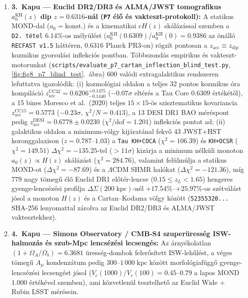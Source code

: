 \documentclass[11pt,a4paper]{article}
\theoremstyle{remark}
\begin{document}
\begin{enumerate}
  \item \textbf{3.\ Kapu --- Euclid DR2/DR3 \'es ALMA/JWST tomografikus $a_0^{\mathrm{KH}}(z)$ dip $z = 0.6316$-n\'al (\texttt{P7} \'el\H{o} \'es vakteszt-protokoll):} A statikus MOND-dal ($a_0 = \mathrm{konst.}$) \'es a kinematikai $cH(z)$ sk\'al\'az\'assal szemben a \texttt{D2.\ t\'etel} $6.14\%$-os m\'ely\"ul\'est ($a_0^{\mathrm{KH}}(0.6309)/a_0^{\mathrm{KH}}(0) = 0.9386$ az \"on\'all\'o \texttt{RECFAST v1.5} h\'att\'eren, $0.6316$ Planck PR3-on) r\"ogz\'it pontosan a $z_{\mathrm{acc}} \equiv z_{\mathrm{dip}}$ kozmikus gyorsul\'asi inflekci\'os pontban. T\"obbszond\'as empirikus \'es vakteszt-motorunkat (\texttt{scripts/\allowbreak evaluate\_\allowbreak p7\_\allowbreak cartan\_\allowbreak inflection\_\allowbreak blind\_\allowbreak test.py}, \ref{fig:fig8_p7_blind_test}.\ \'abra) $600$ val\'odi extragalaktikus rendszeren lefuttatva igazol\'odik: (i) kozmol\'ogiai oldalon a teljes 32 pontos kozmikus \'ora kompil\'aci\'o $z_{\mathrm{acc}}^{\mathrm{CC32}} = 0.6206_{-0.1440}^{+0.1475}$ (\textbf{$-0.07\sigma$} elt\'er\'es a Tau Core $0.6309$ \'ert\'ek\'et\H{o}l), a 15 bines Moresco et al.\ (2020) teljes $15\times 15$-\"os szisztematikus kovariancia $z_{\mathrm{acc}}^{\mathrm{CC15}} = 0.5773$ ($-0.23\sigma$, $\chi^2/N = 0.413$), a 13 DESI DR1 BAO m\'er\'espont pedig $z_{\mathrm{acc}}^{\mathrm{DESI}} = 0.6778 \pm 0.0230$ ($\chi^2/\mathrm{dof} = 1.201$) inflekci\'os pontot ad; (ii) galaktikus oldalon a minimum-v\"olgy kij\'arat\'anal fekv\H{o} 43 JWST+HST koronggalaxison ($z = 0.787$--$1.03$) a \texttt{Tau KH+COCA} ($\chi^2 = 106.39$) \'es \texttt{KH+OCSR} ($\chi^2 = 149.51$) $\Delta\chi^2 = -135.25$-tel ($>11\sigma$) kiz\'arja a minimum n\'elk\"uli monoton $a_0(z)\propto H(z)$ sk\'al\'az\'ast ($\chi^2 = 284.76$), valamint fel\"ulm\'ulja a statikus MOND-ot ($\Delta\chi^2 = -87.69$) \'es a $\Lambda\mathrm{CDM}$ SHMR hal\'okat ($\Delta\chi^2 = -121.36$), m\'ig $779$ nagy t\"omeg\H{u} \'el\H{o} Euclid DR1 el\H{o}t\'er-lencse ($0.15 \le z_L < 1.65$) hengeres gyenge-lencs\'ez\'esi profilja $\Delta\Sigma(200\;\mathrm{kpc})$-n\'el $+17.54\%$--$+25.97\%$-os sz\'etv\'al\'ast j\'osol a monoton $H(z)$ \'es a Cartan--Kodama v\"olgy k\"oz\"ott (\texttt{52355320...} SHA-256 lenyomattal z\'arolva az Euclid DR2/DR3 \'es ALMA/JWST vaktesztekhez).
  \item \textbf{4.\ Kapu --- Simons Observatory / CMB-S4 szuper\"uress\'eg ISW-halmoz\'as \'es szub-Mpc lencs\'ez\'esi lecseng\'es:} Az \'arny\'ekolatlan $(1 + \Omega_A/\Omega_b) = 6.3681$ \"uress\'eg-dombok feler\H{o}s\'itett ISW-leh\H{u}l\'est, a v\'eges t\"omeg\H{u} $A_\mu$ kondenz\'atum pedig $300$--$1\,000\;\mathrm{kpc}$ k\"oz\"ott morfol\'ogiaf\"ugg\H{o} gyenge-lencs\'ez\'esi lecseng\'est j\'osol ($V_c(1000)/V_c(100) = 0.45$--$0.79$ a lapos MOND $1.000$ \'ert\'ek\'evel szemben), ami k\"ozvetlen\"ul tesztelhet\H{o} az Euclid Wide + Rubin LSST m\'er\'esein.

\end{enumerate}
\end{document}
